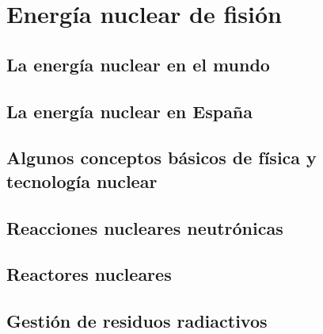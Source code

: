 \chapter{Energía nuclear de fisión}
\section{La energía nuclear en el mundo}


\section{La energía nuclear en España}

\section{ Algunos conceptos básicos de física y tecnología nuclear}

\section{Reacciones nucleares neutrónicas}

\section{Reactores nucleares}

\section{Gestión de residuos radiactivos}